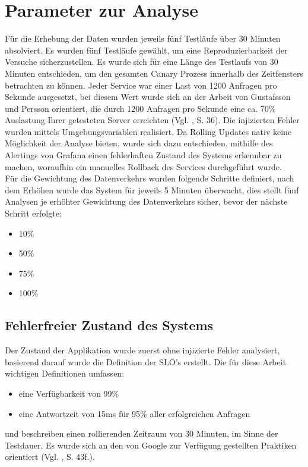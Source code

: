 \documentclass[
12pt,
a4paper,
twoside,
openright
]{report}
\begin{document}
	\section{Parameter zur Analyse}
	Für die Erhebung der Daten wurden jeweils fünf Testläufe über 30 Minuten absolviert. Es wurden fünf Testläufe gewählt, um eine Reproduzierbarkeit der Versuche sicherzustellen. Es wurde sich für eine Länge des Testlaufs von 30 Minuten entschieden, um den gesamten Canary Prozess innerhalb des Zeitfensters betrachten zu können. Jeder Service war einer Last von 1200 Anfragen pro Sekunde ausgesetzt, bei diesem Wert wurde sich an der Arbeit von Gustafsson und Persson orientiert, die durch 1200 Anfragen pro Sekunde eine ca. 70\% Auslastung Ihrer getesteten Server erreichten (Vgl. \parencite{gustafsson2024comparison}, S. 36). Die injizierten Fehler wurden mittels Umgebungsvariablen realisiert. Da Rolling Updates nativ keine Möglichkeit der Analyse bieten, wurde sich dazu entschieden, mithilfe des Alertings von Grafana einen fehlerhaften Zustand des Systems erkennbar zu machen, woraufhin ein manuelles Rollback des Services durchgeführt wurde. \\
	Für die Gewichtung des Datenverkehrs wurden folgende Schritte definiert, nach dem Erhöhen wurde das System für jeweils 5 Minuten überwacht, dies stellt fünf Analysen je erhöhter Gewichtung des Datenverkehrs sicher, bevor der nächste Schritt erfolgte: 
	\begin{itemize}
		\item 10\% 
		\item 50\%
		\item 75\%
		\item 100\%
	\end{itemize}
	
	\subsection{Fehlerfreier Zustand des Systems}
	Der Zustand der Applikation wurde zuerst ohne injizierte Fehler analysiert, basierend darauf wurde die Definition der SLO's erstellt. Die für diese Arbeit wichtigen Definitionen umfassen: 
	\begin{itemize}
		\item eine Verfügbarkeit von 99\%
		\item eine Antwortzeit von 15ms für 95\% aller erfolgreichen Anfragen 
	\end{itemize}
	und beschreiben einen rollierenden Zeitraum von 30 Minuten, im Sinne der Testdauer. Es wurde sich an den von Google zur Verfügung gestellten Praktiken orientiert (Vgl.  \parencite{GoogleSRE}, S. 43f.).
	
\end{document}
